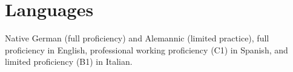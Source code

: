 \section{Languages}

Native German (full proficiency) and Alemannic (limited practice), 
full proficiency in English, 
professional working proficiency (C1) in Spanish, 
and limited proficiency (B1) in Italian.


